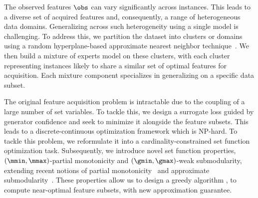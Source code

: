 \documentclass[letterpaper]{article}
\renewcommand{\cite}{\citep}
\begin{document}
The observed features $\obs$ can vary significantly across instances.  This leads to a diverse set of acquired features and, consequently, a range of heterogeneous data domains. Generalizing across such heterogeneity using a single model is challenging. 
To address this, we partition the dataset into clusters or domains using a random hyperplane-based approximate nearest neighbor technique~\cite{indyk1999approximate}. We then build a mixture of experts model on these clusters, with each cluster representing instances likely to share a similar set of optimal features for acquisition. Each mixture component specializes in generalizing on a specific data subset.





 
 
The original feature acquisition problem is intractable due to the coupling of a large number of set variables. To tackle this, we design a surrogate loss guided by generator confidence and seek to minimize it alongside the feature subsets. This leads to a discrete-continuous optimization framework which is NP-hard. To tackle this problem, we reformulate it into a cardinality-constrained set function optimization task. Subsequently, we  introduce novel set function properties, $(\mmin,\mmax)$-partial monotonicity and $(\gmin,\gmax)$-weak submodularity, extending recent notions of partial monotonicity~\cite{mualem2022using} and  approximate submodularity~\cite{elenberg2018restricted,harshaw2019submodular,cuha}. These properties allow us to design a greedy algorithm \our, to compute near-optimal feature subsets, with new approximation guarantee.
\end{document}
